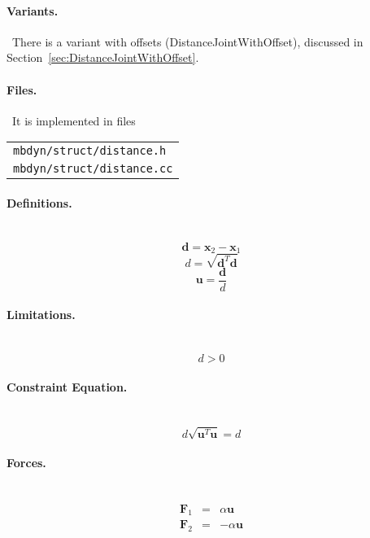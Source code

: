 \documentclass[10pt,dvips,fleqn]{report}
\newcommand{\T}[1]{\boldsymbol{#1}}
\begin{document}
\paragraph{Variants.} \
There is a variant with offsets (DistanceJointWithOffset),
discussed in Section~\ref{sec:DistanceJointWithOffset}.

\paragraph{Files.} \
It is implemented in files

\begin{tabular}{l}
\texttt{mbdyn/struct/distance.h} \\
\texttt{mbdyn/struct/distance.cc}
\end{tabular}

\paragraph{Definitions.} \
\begin{equation}
	\T{d} = \T{x}_2 - \T{x}_1
\end{equation}
\begin{equation}
	d = \sqrt{\T{d}^T \T{d}}
\end{equation}
\begin{equation}
	\T{u} = \frac{\T{d}}{d}
\end{equation}

\paragraph{Limitations.} \
\begin{equation}
	d > 0
\end{equation}

\paragraph{Constraint Equation.} \
\begin{equation}
	d \sqrt{\T{u}^T \T{u}} = d
\end{equation}

\paragraph{Forces.} \
\begin{eqnarray}
	\T{F}_1 & = & \alpha \T{u} \\
	\T{F}_2 & = & -\alpha \T{u}
\end{eqnarray}
\end{document}
